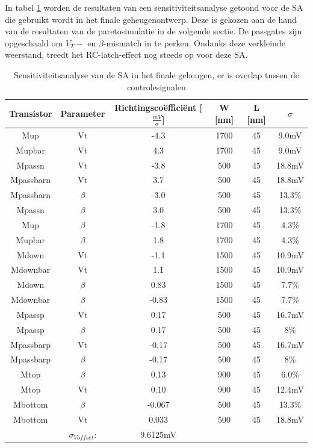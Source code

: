In tabel \ref{tab:ourSA-sensanalysis-overlap} worden de resultaten van een sensitiviteitsanalyse getoond voor de SA die gebruikt wordt in het finale geheugenontwerp. Deze is gekozen aan de hand van de resultaten van de paretosimulatie in de volgende sectie. De passgates zijn opgeschaald om $V_{T}-$ en $\beta$-mismatch in te perken. Ondanks deze verkleinde weerstand, treedt het RC-latch-effect nog steeds op voor deze SA.


\begin{table}
\begin{tabular}{cccccc}
\hline 
Transistor & Parameter & Richtingscoëfficiënt [$\frac{mV}{\sigma}$] & W [nm] & L [nm] & $\sigma$ \\ 
\hline 
Mup & Vt & -4.3 & 1700 & 45 & 9.0mV \\ 
Mupbar & Vt & 4.3 & 1700 & 45 & 9.0mV \\ 
Mpassn & Vt & -3.8 & 500 & 45 & 18.8mV \\
Mpassbarn & Vt & 3.7 & 500 & 45 & 18.8mV \\
Mpassbarn & $\beta$ & -3.0 & 500 & 45 & 13.3\% \\ 
Mpassn & $\beta$ & 3.0 & 500 & 45 & 13.3\% \\ 
Mup & $\beta$ & -1.8 & 1700 & 45 & 4.3\% \\ 
Mupbar & $\beta$ & 1.8 & 1700 & 45 & 4.3\% \\ 
Mdown & Vt & -1.1 & 1500 & 45 & 10.9mV \\ 
Mdownbar & Vt & 1.1 & 1500 & 45 & 10.9mV \\
Mdown & $\beta$ & 0.83 & 1500 & 45 & 7.7\% \\
Mdownbar & $\beta$ & -0.83 & 1500 & 45 & 7.7\% \\  
Mpassp & Vt & 0.17 & 500 & 45 & 16.7mV \\ 
Mpassp & $\beta$ & 0.17 & 500 & 45 & 8\% \\ 
Mpassbarp & Vt & -0.17 & 500 & 45 & 16.7mV \\
Mpassbarp & $\beta$ & -0.17 & 500 & 45 & 8\% \\ 
Mtop & $\beta$ & 0.13 & 900 & 45 & 6.0\% \\ 
Mtop & Vt & 0.10 & 900 & 45 & 12.4mV \\ 
Mbottom & $\beta$ & -0.067 & 500 & 45 & 13.3\% \\ 
Mbottom & Vt & 0.033 & 500 & 45 & 18.8mV \\ 
\hline 
\hline & $\sigma_{Voffset}$: & 9.6125mV & & & \\
\hline
\end{tabular} 
\caption[Sensitiviteitsanalyse van de SA in het finale geheugen]{Sensitiviteitsanalyse van de SA in het finale geheugen, er is overlap tussen de controlesignalen}
\label{tab:ourSA-sensanalysis-overlap}
\end{table}

